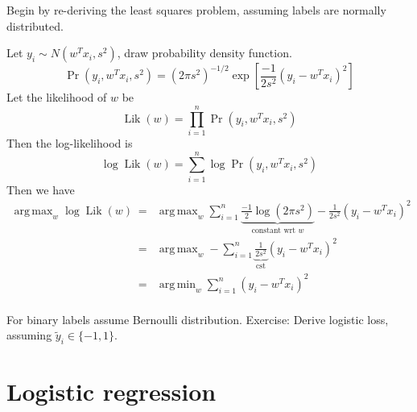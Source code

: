 \documentclass{article}
\DeclareMathOperator*{\argmin}{arg\,min}
\DeclareMathOperator*{\argmax}{arg\,max}
\DeclareMathOperator*{\Lik}{Lik}
\begin{document}
Begin by re-deriving the least squares problem, assuming labels are
normally distributed.

Let $y_i\sim N(w^T x_i, s^2)$, draw probability density function.
\begin{equation*}
  \Pr(y_i, w^T x_i, s^2) = (2\pi s^2)^{-1/2} \exp\left[
\frac{-1}{2s^2}(y_i-w^Tx_i)^2
\right]
\end{equation*}
Let the likelihood of $w$ be
\begin{equation*}
  \Lik(w) = \prod_{i=1}^n \Pr(y_i, w^T x_i, s^2)
\end{equation*}
Then the log-likelihood is
\begin{equation*}
  \log\Lik(w) = \sum_{i=1}^n \log\Pr(y_i, w^T x_i, s^2)
\end{equation*}
Then we have 
\begin{eqnarray*}
  \argmax_w \log\Lik(w) 
&=& \argmax_w \sum_{i=1}^n \underbrace{
\frac{-1}{2}\log(2\pi s^2)
}_{\text{constant wrt $w$}} -
\frac{1}{2s^2}(y_i-w^Tx_i)^2\\
&=& \argmax_w -\sum_{i=1}^n
\underbrace{
\frac{1}{2s^2}
}_{\text{cst}}(y_i-w^Tx_i)^2\\
&=& \argmin_w \sum_{i=1}^n
(y_i-w^Tx_i)^2\\
\end{eqnarray*}

For binary labels assume Bernoulli distribution. Exercise: Derive
logistic loss, assuming $\tilde y_i\in\{-1,1\}$.

\section{Logistic regression}
\end{document}
